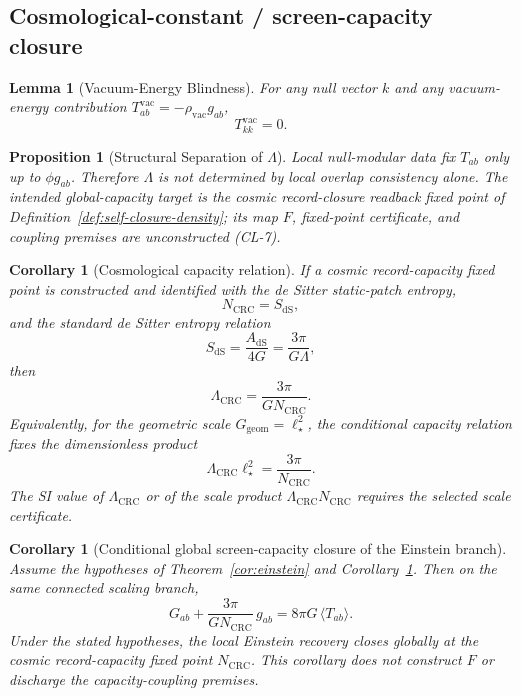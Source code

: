 \documentclass[11pt]{article}
\newtheorem{corollary}[theorem]{Corollary}
\newtheorem{proposition}[theorem]{Proposition}
\newtheorem{lemma}[theorem]{Lemma}
\begin{document}
\subsection{Cosmological-constant / screen-capacity closure}

\begin{lemma}[Vacuum-Energy Blindness]\label{lem:vac}
For any null vector $k$ and any vacuum-energy contribution $T^{\mathrm{vac}}_{ab}=-\rho_{\mathrm{vac}}g_{ab}$,
\[
T^{\mathrm{vac}}_{kk}=0.
\]
\end{lemma}

\begin{proposition}[Structural Separation of $\Lambda$]\label{prop:lambda}
Local null-modular data fix $T_{ab}$ only up to $\phi g_{ab}$. Therefore $\Lambda$ is not determined by local overlap consistency alone. The intended global-capacity target is the cosmic record-closure readback fixed point of Definition~\ref{def:self-closure-density}; its map \(F\), fixed-point certificate, and coupling premises are unconstructed (CL-7).
\end{proposition}

\begin{corollary}[Cosmological capacity relation]\label{cor:lambda}
If a cosmic record-capacity fixed point is constructed and identified with the de Sitter static-patch
entropy,
\[
N_{\mathrm{CRC}}=S_{\mathrm{dS}},
\]
\noindent and the standard de Sitter entropy relation
\[
S_{\mathrm{dS}}=\frac{A_{\mathrm{dS}}}{4G}=\frac{3\pi}{G\Lambda},
\]
then
\[
\Lambda_{\mathrm{CRC}}=\frac{3\pi}{G N_{\mathrm{CRC}}}.
\]
Equivalently, for the geometric scale \(G_{\mathrm{geom}}=\ell_\star^2\), the conditional capacity relation fixes
the dimensionless product
\[
\Lambda_{\mathrm{CRC}}\ell_\star^2=\frac{3\pi}{N_{\mathrm{CRC}}}.
\]
The SI value of \(\Lambda_{\mathrm{CRC}}\) or of the scale product
\(\Lambda_{\mathrm{CRC}}N_{\mathrm{CRC}}\) requires the selected scale certificate.
\end{corollary}

\begin{corollary}[Conditional global screen-capacity closure of the Einstein branch]\label{cor:lambda-global}
Assume the hypotheses of Theorem~\ref{cor:einstein} and Corollary~\ref{cor:lambda}. Then on the same connected scaling branch,
\[
G_{ab}+\frac{3\pi}{G N_{\mathrm{CRC}}}\,g_{ab}=8\pi G\,\langle T_{ab}\rangle.
\]
Under the stated hypotheses, the local Einstein recovery closes globally at the cosmic
record-capacity fixed point \(N_{\mathrm{CRC}}\).  This corollary does not construct \(F\) or
discharge the capacity-coupling premises.
\end{corollary}
\end{document}
